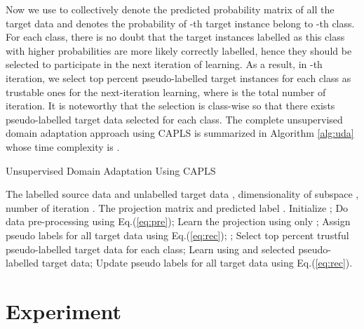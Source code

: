 \documentclass[conference]{IEEEtran}
\begin{document}
Now we use  to collectively denote the predicted probability matrix of all the target data and  denotes the probability of -th target instance belong to -th class. For each class, there is no doubt that the target instances labelled as this class with higher probabilities are more likely correctly labelled, hence they should be selected to participate in the next iteration of learning. As a result, in -th iteration, we select top  percent pseudo-labelled target instances for each class as trustable ones for the next-iteration learning, where  is the total number of iteration. It is noteworthy that the selection is class-wise so that there exists pseudo-labelled target data selected for each class. The complete unsupervised domain adaptation approach using CAPLS is summarized in Algorithm \ref{alg:uda} whose time complexity is .
\begin{algorithm}[tb]
	\caption{Unsupervised Domain Adaptation Using CAPLS}
	\label{alg:uda}
	\renewcommand{\algorithmicrequire}{\textbf{Input:}}
	\renewcommand{\algorithmicensure}{\textbf{Output:}}
	\begin{algorithmic}[1]
		\REQUIRE The labelled source data  and unlabelled target data , dimensionality of subspace , number of iteration .
		\ENSURE The projection matrix  and predicted label .
		\STATE Initialize ;
		\STATE Do data pre-processing using Eq.(\ref{eq:pre});
		\STATE Learn the projection  using only ;
		\STATE Assign pseudo labels for all target data using Eq.(\ref{eq:rec});
		\WHILE {}
		\STATE ;
		\STATE Select top  percent trustful pseudo-labelled target data for each class;
		\STATE Learn  using  and selected pseudo-labelled target data;
		\STATE Update pseudo labels for all target data using Eq.(\ref{eq:rec}).
		\ENDWHILE
	\end{algorithmic}
\end{algorithm}

\section{Experiment}\label{sec:experiment}
\end{document}
